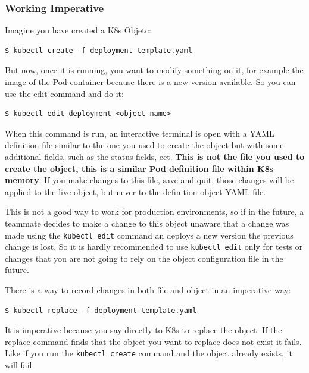 \documentclass{article}
\newenvironment{blocktemplateII}[1]{%
    \tcolorbox[beamer,%
    noparskip,breakable,
    colframe=Green,%
    colbacklower=LimeGreen!75!LightGreen,%
    title=#1]}%
    {\endtcolorbox}
\newenvironment{codetemplate}[1][]{%
  \mybasecolorbox[#1]
  \itshape
}{%
  \endmybasecolorbox
}
\begin{document}
\subsubsection{Working Imperative}

Imagine you have created a K8s Objetc:

\begin{codetemplate}{}
\begin{verbatim}
$ kubectl create -f deployment-template.yaml
\end{verbatim}
\end{codetemplate}

But now, once it is running, you want to modify something on it, for example the image of the Pod container because there is a new version available. So you can use the edit command and do it:

\begin{codetemplate}{}
\begin{verbatim}
$ kubectl edit deployment <object-name>
\end{verbatim}
\end{codetemplate}

When this command is run, an interactive terminal is open with a YAML definition file similar to the one you used to create the object but with some additional fields, such as the status fields, ect. \textbf{This is not the file you used to create the object, this is a similar Pod definition file within K8s memory}. If you make changes to this file, save and quit, those changes will be applied to the live object, but never to the definition object YAML file.

This is not a good way to work for production environments, so if in the future, a teammate decides to make a change to this object unaware that a change was made using the \verb|kubectl edit| command an deploys a new version the previous change is lost. So it is hardly recommended to use \verb|kubectl edit| only for tests or changes that you are not going to rely on the object configuration file in the future.

\begin{blocktemplateII}{NOTE}
There is a way to record changes in both file and object in an imperative way:
\begin{codetemplate}{}
\begin{verbatim}
$ kubectl replace -f deployment-template.yaml
\end{verbatim}
\end{codetemplate}

It is imperative because you say directly to K8s to replace the object. If the replace command finds that the object you want to replace does not exist it fails. Like if you run the \verb|kubectl create| command and the object already exists, it will fail.
\end{blocktemplateII}
\end{document}
